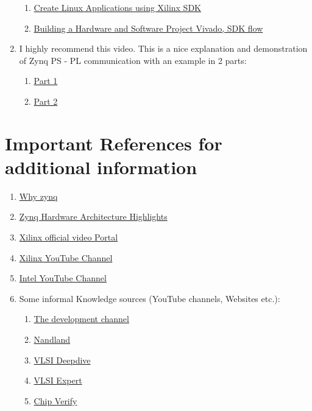 \begin{enumerate}
\begin{enumerate}
        \item \href{https://www.youtube.com/watch?v=lBR3GlVQuTQ&list=PLRr5m7hDN9TKiMF5fhq3EyoOjQVHyZkry&index=8}{Create Linux Applications using Xilinx SDK}                 
        \item \href{https://www.youtube.com/watch?v=u0bW6lQvsVI}{Building a Hardware and Software Project Vivado, SDK flow}
    \end{enumerate}
    \item I highly recommend this video. This is a nice explanation and demonstration of Zynq PS - PL communication with an example in 2 parts: 
    \begin{enumerate}
        \item \href{https://www.youtube.com/watch?v=_odNhKOZjEo}{Part 1} 
        \item \href{https://www.youtube.com/watch?v=AOy5l36DroY}{Part 2} 
    \end{enumerate}
\end{enumerate}

\section{Important References for additional information}
\begin{enumerate}
    \item \href{https://www.youtube.com/watch?v=w2qGO0HwTRY&list=PLRr5m7hDN9TKiMF5fhq3EyoOjQVHyZkry&index=10}{Why zynq}                              
    \item \href{https://youtu.be/-VE97r5XpEU}{Zynq Hardware Architecture Highlights}
    \item \href{https://www.xilinx.com/video.html}{Xilinx official video Portal}         
    \item \href{https://www.youtube.com/user/XilinxInc}{Xilinx YouTube Channel}               
    \item \href{https://www.youtube.com/channel/UC0wEPiFb0J6AZZ3oPXRoRpw}{Intel YouTube Channel}                
    \item Some informal Knowledge sources (YouTube channels, Websites etc.):
    \begin{enumerate}
        \item \href{https://www.youtube.com/channel/UC1ptV25-NEHRIEnM1kXMCrQ}{The development channel} 
        \item \href{https://www.youtube.com/channel/UCsdA-aNqtMA1_2T15aXePWw}{Nandland} 
        \item \href{https://vlsideepdive.com/}{VLSI Deepdive}
        \item \href{http://www.vlsi-expert.com/}{VLSI Expert}    
        \item \href{https://www.chipverify.com/verilog/verilog-tutorial}{Chip Verify}    
    \end{enumerate}
\end{enumerate}


